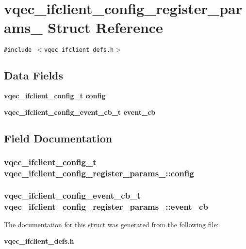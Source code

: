 \section{vqec\_\-ifclient\_\-config\_\-register\_\-params\_\- Struct Reference}
\label{structvqec__ifclient__config__register__params__}
{\tt \#include $<$vqec\_\-ifclient\_\-defs.h$>$}

\subsection*{Data Fields}
\begin{CompactItemize}
\item 
\bf{vqec\_\-ifclient\_\-config\_\-t} \bf{config}
\item 
\bf{vqec\_\-ifclient\_\-config\_\-event\_\-cb\_\-t} \bf{event\_\-cb}
\end{CompactItemize}


\subsection{Field Documentation}
\subsubsection{\setlength{\rightskip}{0pt plus 5cm}\bf{vqec\_\-ifclient\_\-config\_\-t} \bf{vqec\_\-ifclient\_\-config\_\-register\_\-params\_\-::config}}\label{structvqec__ifclient__config__register__params___6e67f504e4e5da45c50f8ddf1a721abb}


\subsubsection{\setlength{\rightskip}{0pt plus 5cm}\bf{vqec\_\-ifclient\_\-config\_\-event\_\-cb\_\-t} \bf{vqec\_\-ifclient\_\-config\_\-register\_\-params\_\-::event\_\-cb}}\label{structvqec__ifclient__config__register__params___461bd611e25128b96b99ad33f6ea9113}




The documentation for this struct was generated from the following file:\begin{CompactItemize}
\item 
\bf{vqec\_\-ifclient\_\-defs.h}\end{CompactItemize}
